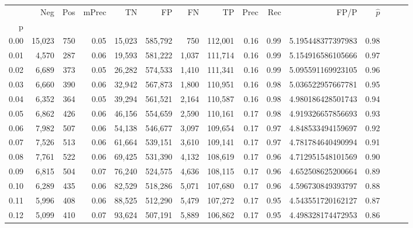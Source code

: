 \begin{tabular}{rrrrrrrrrrrrrrr}
\toprule
{} &     Neg &    Pos & mPrec &       TN &       FP &       FN &       TP &  Prec &   Rec &                 FP/P & $\hat{p}$ \\
p    &         &        &       &          &          &          &          &       &       &                      &           \\
\midrule
0.00 &  15,023 &    750 &  0.05 &   15,023 &  585,792 &      750 &  112,001 &  0.16 &  0.99 &    5.195448377397983 &      0.98 \\
0.01 &   4,570 &    287 &  0.06 &   19,593 &  581,222 &    1,037 &  111,714 &  0.16 &  0.99 &    5.154916586105666 &      0.97 \\
0.02 &   6,689 &    373 &  0.05 &   26,282 &  574,533 &    1,410 &  111,341 &  0.16 &  0.99 &    5.095591169923105 &      0.96 \\
0.03 &   6,660 &    390 &  0.06 &   32,942 &  567,873 &    1,800 &  110,951 &  0.16 &  0.98 &    5.036522957667781 &      0.95 \\
0.04 &   6,352 &    364 &  0.05 &   39,294 &  561,521 &    2,164 &  110,587 &  0.16 &  0.98 &    4.980186428501743 &      0.94 \\
0.05 &   6,862 &    426 &  0.06 &   46,156 &  554,659 &    2,590 &  110,161 &  0.17 &  0.98 &    4.919326657856693 &      0.93 \\
0.06 &   7,982 &    507 &  0.06 &   54,138 &  546,677 &    3,097 &  109,654 &  0.17 &  0.97 &    4.848533494159697 &      0.92 \\
0.07 &   7,526 &    513 &  0.06 &   61,664 &  539,151 &    3,610 &  109,141 &  0.17 &  0.97 &    4.781784640490994 &      0.91 \\
0.08 &   7,761 &    522 &  0.06 &   69,425 &  531,390 &    4,132 &  108,619 &  0.17 &  0.96 &    4.712951548101569 &      0.90 \\
0.09 &   6,815 &    504 &  0.07 &   76,240 &  524,575 &    4,636 &  108,115 &  0.17 &  0.96 &    4.652508625200664 &      0.89 \\
0.10 &   6,289 &    435 &  0.06 &   82,529 &  518,286 &    5,071 &  107,680 &  0.17 &  0.96 &    4.596730849393797 &      0.88 \\
0.11 &   5,996 &    408 &  0.06 &   88,525 &  512,290 &    5,479 &  107,272 &  0.17 &  0.95 &    4.543551720162127 &      0.87 \\
0.12 &   5,099 &    410 &  0.07 &   93,624 &  507,191 &    5,889 &  106,862 &  0.17 &  0.95 &    4.498328174472953 &      0.86 \\

\end{tabular}
